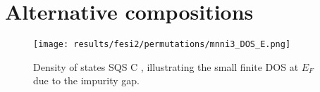 \chapter{Alternative compositions}
\label{appendix:ealt}

\begin{figure}[H]
\texttt{[image: results/fesi2/permutations/mnni3\_DOS\_E.png]}
\caption{Density of states SQS C , illustrating the small finite DOS at $E_F$ due to the impurity gap.}
\end{figure}